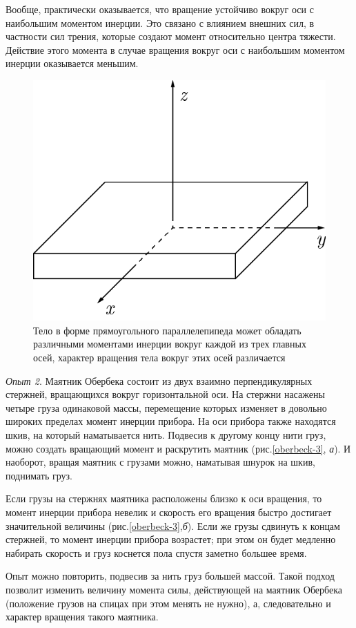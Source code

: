 \documentclass[14pt,a4paper,oneside]{extarticle}	%
\begin{document}
	Вообще, практически оказывается, что вращение устойчиво вокруг оси с наибольшим моментом инерции.
	Это связано с влиянием внешних сил, в частности сил трения, которые создают момент относительно центра тяжести.
	Действие этого момента в случае вращения вокруг оси с наибольшим моментом инерции оказывается меньшим.
	
		\begin{figure}[H] 	
		\centering 	
		\includegraphics[width=0.45\linewidth]{oberbeck-2.png}
		\caption{Тело в форме прямоугольного параллелепипеда может обладать различными моментами инерции вокруг каждой из трех главных осей, характер вращения тела вокруг этих осей различается}
		\label{oberbeck-2}
	\end{figure}

	\textit{Опыт 2}. Маятник Обербека состоит из двух взаимно перпендикулярных стержней, вращающихся вокруг горизонтальной оси.
На стержни насажены четыре груза одинаковой массы, перемещение которых изменяет в довольно широких пределах момент инерции прибора. 
На оси прибора также находятся шкив, на который наматывается нить.
Подвесив к другому концу нити груз, можно создать вращающий момент и раскрутить маятник (рис.\ref{oberbeck-3}, \textit{а}).
И наоборот, вращая маятник с грузами можно, наматывая шнурок на шкив, поднимать груз.

Если грузы на стержнях маятника расположены близко к оси вращения, то момент инерции прибора невелик и скорость его вращения быстро достигает значительной величины (рис.\ref{oberbeck-3},\textit{б}).
Если же грузы сдвинуть к концам стержней, то момент инерции прибора возрастет; при этом он будет медленно набирать скорость и груз коснется пола спустя заметно большее время.

Опыт можно повторить, подвесив за нить груз большей массой.
Такой подход позволит изменить величину момента силы, действующей на маятник Обербека (положение грузов на спицах при этом менять не нужно), а, следовательно и характер вращения такого маятника.
	
\end{document}
